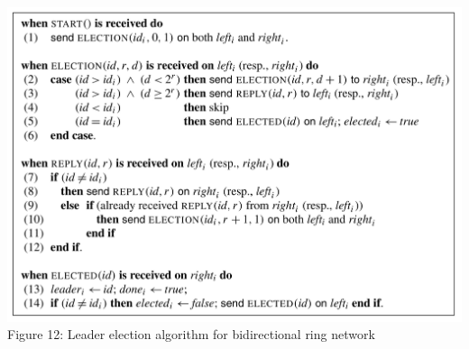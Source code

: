 \documentclass{article}
\begin{document}
	\begin{center}
		\includegraphics[scale=0.17]{IMG_7599}
		\\Figure 12: Leader election algorithm for bidirectional ring network		
	\end{center}
\end{document}
